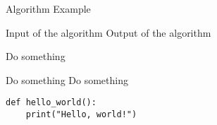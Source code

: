 \documentclass{article}
\begin{document}
\begin{algorithm}[htb]
\caption{Algorithm Example}
\label{alg:algorithm}
\begin{algorithmic}
\Require Input of the algorithm
\Ensure Output of the algorithm

\State Do something

     
        \State Do something
    \EndFor
        \State Do something
    \EndIf
\EndFor
\end{algorithmic}
\end{algorithm}



\begin{lstlisting}[style=mypython,caption={Python code.}, label={code}]
def hello_world():
    print("Hello, world!")
\end{lstlisting}




\clearpage

\printbibliography
\end{document}
